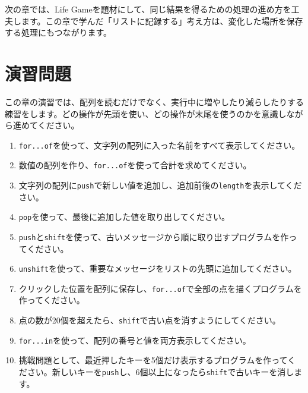 次の章では、Life Gameを題材にして、同じ結果を得るための処理の進め方を工夫します。この章で学んだ「リストに記録する」考え方は、変化した場所を保存する処理にもつながります。

\section{演習問題}

この章の演習では、配列を読むだけでなく、実行中に増やしたり減らしたりする練習をします。どの操作が先頭を使い、どの操作が末尾を使うのかを意識しながら進めてください。

\begin{enumerate}
    \item \texttt{for...of}を使って、文字列の配列に入った名前をすべて表示してください。
    \item 数値の配列を作り、\texttt{for...of}を使って合計を求めてください。
    \item 文字列の配列に\texttt{push}で新しい値を追加し、追加前後の\texttt{length}を表示してください。
    \item \texttt{pop}を使って、最後に追加した値を取り出してください。
    \item \texttt{push}と\texttt{shift}を使って、古いメッセージから順に取り出すプログラムを作ってください。
    \item \texttt{unshift}を使って、重要なメッセージをリストの先頭に追加してください。
    \item クリックした位置を配列に保存し、\texttt{for...of}で全部の点を描くプログラムを作ってください。
    \item 点の数が20個を超えたら、\texttt{shift}で古い点を消すようにしてください。
    \item \texttt{for...in}を使って、配列の番号と値を両方表示してください。
    \item 挑戦問題として、最近押したキーを5個だけ表示するプログラムを作ってください。新しいキーを\texttt{push}し、6個以上になったら\texttt{shift}で古いキーを消します。
\end{enumerate}
